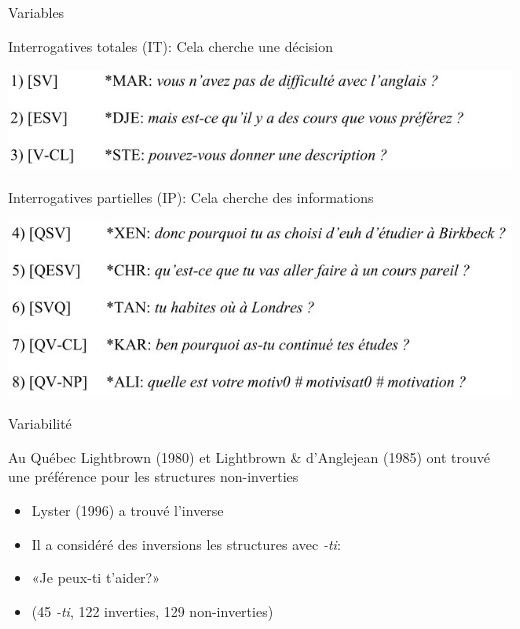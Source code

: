 \documentclass{beamer}
\begin{document}
    \begin{frame}{Variables}
      \begin{block}{}
        Interrogatives totales (IT): Cela cherche une décision
      \end{block}
      \includegraphics[scale=0.5]{interrogatives_totales.jpg}
      \begin{block}{}
        Interrogatives partielles (IP): Cela cherche des informations
      \end{block}
      \includegraphics[scale=0.5]{interrogatives_partielles.jpg}
    \end{frame}

    \begin{frame}{Variabilité}
      \begin{block}{Au Québec}
        Lightbrown (1980) et Lightbrown \& d'Anglejean (1985) ont trouvé une préférence pour les structures non-inverties
        \begin{itemize}
          \item Lyster (1996) a trouvé l'inverse
          \item Il a considéré des inversions les structures avec \emph{-ti}:
          \item «Je peux-ti t'aider?»
          \item (45 \emph{-ti}, 122 inverties, 129 non-inverties)
        \end{itemize}
      \end{block}
    \end{frame}
\end{document}
